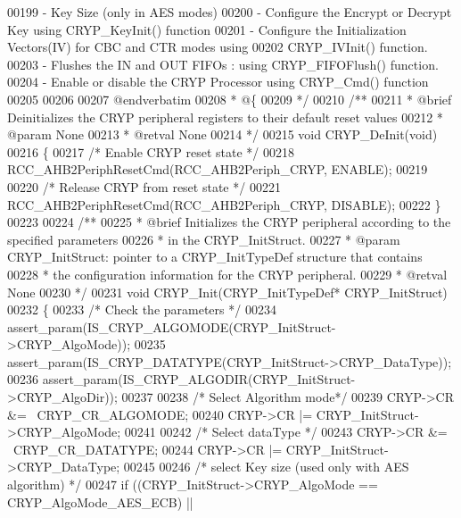 \begin{DoxyCode}
00199 \textcolor{comment}{      - Key Size (only in AES modes)}
00200 \textcolor{comment}{   - Configure the Encrypt or Decrypt Key using CRYP\_KeyInit() function }
00201 \textcolor{comment}{   - Configure the Initialization Vectors(IV) for CBC and CTR modes using }
00202 \textcolor{comment}{     CRYP\_IVInit() function.  }
00203 \textcolor{comment}{   - Flushes the IN and OUT FIFOs : using CRYP\_FIFOFlush() function.                         }
00204 \textcolor{comment}{   - Enable or disable the CRYP Processor using CRYP\_Cmd() function }
00205 \textcolor{comment}{    }
00206 \textcolor{comment}{   }
00207 \textcolor{comment}{@endverbatim}
00208 \textcolor{comment}{  * @\{}
00209 \textcolor{comment}{  */}
00210 \textcolor{comment}{/**}
00211 \textcolor{comment}{  * @brief  Deinitializes the CRYP peripheral registers to their default reset values}
00212 \textcolor{comment}{  * @param  None}
00213 \textcolor{comment}{  * @retval None}
00214 \textcolor{comment}{  */}
00215 \textcolor{keywordtype}{void} CRYP_DeInit(\textcolor{keywordtype}{void})
00216 \{
00217   \textcolor{comment}{/* Enable CRYP reset state */}
00218   RCC_AHB2PeriphResetCmd(RCC_AHB2Periph_CRYP, ENABLE);
00219 
00220   \textcolor{comment}{/* Release CRYP from reset state */}
00221   RCC_AHB2PeriphResetCmd(RCC_AHB2Periph_CRYP, DISABLE);
00222 \}
00223 
00224 \textcolor{comment}{/**}
00225 \textcolor{comment}{  * @brief  Initializes the CRYP peripheral according to the specified parameters}
00226 \textcolor{comment}{  *         in the CRYP\_InitStruct.}
00227 \textcolor{comment}{  * @param  CRYP\_InitStruct: pointer to a CRYP\_InitTypeDef structure that contains}
00228 \textcolor{comment}{  *         the configuration information for the CRYP peripheral.}
00229 \textcolor{comment}{  * @retval None}
00230 \textcolor{comment}{  */}
00231 \textcolor{keywordtype}{void} CRYP_Init(CRYP\_InitTypeDef* CRYP\_InitStruct)
00232 \{
00233   \textcolor{comment}{/* Check the parameters */}
00234   assert_param(IS\_CRYP\_ALGOMODE(CRYP\_InitStruct->CRYP\_AlgoMode));
00235   assert_param(IS\_CRYP\_DATATYPE(CRYP\_InitStruct->CRYP\_DataType));
00236   assert_param(IS\_CRYP\_ALGODIR(CRYP\_InitStruct->CRYP\_AlgoDir));
00237 
00238   \textcolor{comment}{/* Select Algorithm mode*/}
00239   CRYP->CR &= ~CRYP_CR_ALGOMODE;
00240   CRYP->CR |= CRYP\_InitStruct->CRYP\_AlgoMode;
00241 
00242   \textcolor{comment}{/* Select dataType */}
00243   CRYP->CR &= ~CRYP_CR_DATATYPE;
00244   CRYP->CR |= CRYP\_InitStruct->CRYP\_DataType;
00245 
00246   \textcolor{comment}{/* select Key size (used only with AES algorithm) */}
00247   \textcolor{keywordflow}{if} ((CRYP\_InitStruct->CRYP_AlgoMode == CRYP_AlgoMode_AES_ECB) ||

\end{DoxyCode}
